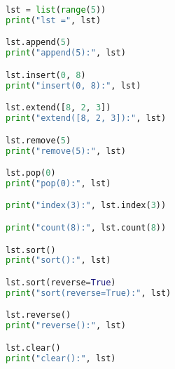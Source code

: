 \begin{table}[H]
	\centering
	\caption{列表操作函数}
\end{table}

\vspace{0.5cm}


\begin{lstlisting}[language=Python]
lst = list(range(5))
print("lst =", lst)

lst.append(5)
print("append(5):", lst)

lst.insert(0, 8)
print("insert(0, 8):", lst)

lst.extend([8, 2, 3])
print("extend([8, 2, 3]):", lst)

lst.remove(5)
print("remove(5):", lst)

lst.pop(0)
print("pop(0):", lst)

print("index(3):", lst.index(3))

print("count(8):", lst.count(8))

lst.sort()
print("sort():", lst)

lst.sort(reverse=True)
print("sort(reverse=True):", lst)

lst.reverse()
print("reverse():", lst)

lst.clear()
print("clear():", lst)
\end{lstlisting}


